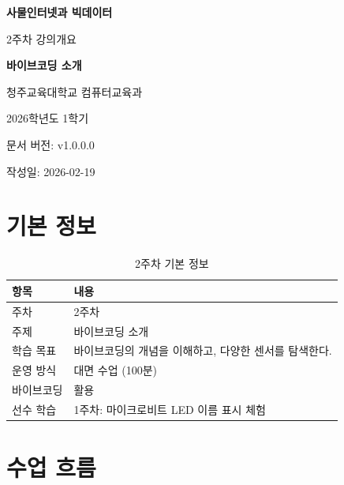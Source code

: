 \documentclass[11pt, a4paper]{article}
\begin{document}
\begin{titlepage}
\centering
\vspace*{3cm}
{\Huge\bfseries\color{mainblue} 사물인터넷과 빅데이터\par}
\vspace{0.5cm}
{\LARGE 2주차 강의개요\par}
\vspace{1.5cm}
{\Huge\bfseries 바이브코딩 소개\par}
\vspace{2cm}
{\large 청주교육대학교 컴퓨터교육과\par}
\vspace{0.3cm}
{\large 2026학년도 1학기\par}
\vspace{3cm}
{\normalsize 문서 버전: v1.0.0.0\par}
{\normalsize 작성일: 2026-02-19\par}
\end{titlepage}

\section{기본 정보}

\begin{table}[H]\centering
\caption{2주차 기본 정보}
\begin{tabular}{ll}\toprule
\textbf{항목} & \textbf{내용} \\\midrule
주차 & 2주차 \\
주제 & 바이브코딩 소개 \\
학습 목표 & 바이브코딩의 개념을 이해하고, 다양한 센서를 탐색한다. \\
운영 방식 & 대면 수업 (100분) \\
바이브코딩 & 활용 \\
선수 학습 & 1주차: 마이크로비트 LED 이름 표시 체험 \\
\bottomrule
\end{tabular}
\end{table}

\section{수업 흐름}
\end{document}
